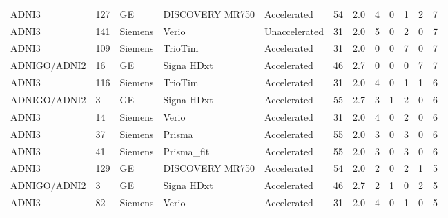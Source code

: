 \documentclass{article}
\providecommand{\DIFaddtex}[1]{{\protect\color{blue}#1}} %
\providecommand{\DIFadd}[1]{\texorpdfstring{\DIFaddtex{#1}}{#1}} %
\begin{document}
\begin{landscape}
\begin{longtable}{lllllrrrrrrr}
\DIFadd{ADNI3 }& \DIFadd{127 }& \DIFadd{GE }& \DIFadd{DISCOVERY MR750 }& \DIFadd{Accelerated }& \DIFadd{54 }& \DIFadd{2.0 }& \DIFadd{4 }& \DIFadd{0 }& \DIFadd{1 }& \DIFadd{2 }& \DIFadd{7 }\\
\DIFadd{ADNI3 }& \DIFadd{141 }& \DIFadd{Siemens }& \DIFadd{Verio }& \DIFadd{Unaccelerated }& \DIFadd{31 }& \DIFadd{2.0 }& \DIFadd{5 }& \DIFadd{0 }& \DIFadd{2 }& \DIFadd{0 }& \DIFadd{7 }\\
\DIFadd{ADNI3 }& \DIFadd{109 }& \DIFadd{Siemens }& \DIFadd{TrioTim }& \DIFadd{Accelerated }& \DIFadd{31 }& \DIFadd{2.0 }& \DIFadd{0 }& \DIFadd{0 }& \DIFadd{7 }& \DIFadd{0 }& \DIFadd{7 }\\
\DIFadd{ADNIGO/ADNI2 }& \DIFadd{16 }& \DIFadd{GE }& \DIFadd{Signa HDxt }& \DIFadd{Accelerated }& \DIFadd{46 }& \DIFadd{2.7 }& \DIFadd{0 }& \DIFadd{0 }& \DIFadd{0 }& \DIFadd{7 }& \DIFadd{7 }\\
\DIFadd{ADNI3 }& \DIFadd{116 }& \DIFadd{Siemens }& \DIFadd{TrioTim }& \DIFadd{Accelerated }& \DIFadd{31 }& \DIFadd{2.0 }& \DIFadd{4 }& \DIFadd{0 }& \DIFadd{1 }& \DIFadd{1 }& \DIFadd{6 }\\
\DIFadd{ADNIGO/ADNI2 }& \DIFadd{3 }& \DIFadd{GE }& \DIFadd{Signa HDxt }& \DIFadd{Accelerated }& \DIFadd{55 }& \DIFadd{2.7 }& \DIFadd{3 }& \DIFadd{1 }& \DIFadd{2 }& \DIFadd{0 }& \DIFadd{6 }\\
\DIFadd{ADNI3 }& \DIFadd{14 }& \DIFadd{Siemens }& \DIFadd{Verio }& \DIFadd{Accelerated }& \DIFadd{31 }& \DIFadd{2.0 }& \DIFadd{4 }& \DIFadd{0 }& \DIFadd{2 }& \DIFadd{0 }& \DIFadd{6 }\\
\DIFadd{ADNI3 }& \DIFadd{37 }& \DIFadd{Siemens }& \DIFadd{Prisma }& \DIFadd{Accelerated }& \DIFadd{55 }& \DIFadd{2.0 }& \DIFadd{3 }& \DIFadd{0 }& \DIFadd{3 }& \DIFadd{0 }& \DIFadd{6 }\\
\DIFadd{ADNI3 }& \DIFadd{41 }& \DIFadd{Siemens }& \DIFadd{Prisma\_fit }& \DIFadd{Accelerated }& \DIFadd{55 }& \DIFadd{2.0 }& \DIFadd{3 }& \DIFadd{0 }& \DIFadd{3 }& \DIFadd{0 }& \DIFadd{6 }\\
\DIFadd{ADNI3 }& \DIFadd{129 }& \DIFadd{GE }& \DIFadd{DISCOVERY MR750 }& \DIFadd{Accelerated }& \DIFadd{54 }& \DIFadd{2.0 }& \DIFadd{2 }& \DIFadd{0 }& \DIFadd{2 }& \DIFadd{1 }& \DIFadd{5 }\\
\DIFadd{ADNIGO/ADNI2 }& \DIFadd{3 }& \DIFadd{GE }& \DIFadd{Signa HDxt }& \DIFadd{Accelerated }& \DIFadd{46 }& \DIFadd{2.7 }& \DIFadd{2 }& \DIFadd{1 }& \DIFadd{0 }& \DIFadd{2 }& \DIFadd{5 }\\
\DIFadd{ADNI3 }& \DIFadd{82 }& \DIFadd{Siemens }& \DIFadd{Verio }& \DIFadd{Accelerated }& \DIFadd{31 }& \DIFadd{2.0 }& \DIFadd{4 }& \DIFadd{0 }& \DIFadd{1 }& \DIFadd{0 }& \DIFadd{5 }\\

\end{longtable}
\end{landscape}
\end{document}
